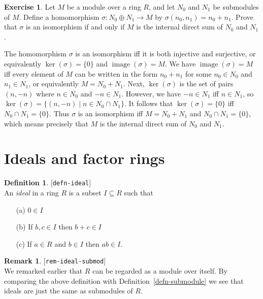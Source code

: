 \documentclass{amsart}
\newcommand{\lbl}[1]{\label{#1}\textup{[\texttt{#1}]}\ \\}
\newcommand{\lbl}{\label}
\newcommand{\img}       {\operatorname{image}}
\newcommand{\sg}        {\sigma}
\newcommand{\sse}       {\subseteq}
\newcommand{\xra}       {\xrightarrow}
\newcommand{\st}        {\;|\;}
\newcommand{\ip}[1]     {\langle #1\rangle}
\newcommand{\op}        {\oplus}
\renewcommand{\:}{\colon}
\theoremstyle{definition}
\newtheorem{remark}[theorem]{Remark}
\newtheorem{definition}[theorem]{Definition}
\newtheorem{exercise}{Exercise}[section]
\renewenvironment{solution}{\SolutionAtEnd}{\endSolutionAtEnd}
\begin{document}
\begin{exercise}
 Let $M$ be a module over a ring $R$, and let $N_0$ and $N_1$ be
 submodules of $M$.  Define a homomorphism $\sg\:N_0\op N_1\xra{}M$ by
 $\sg(n_0,n_1)=n_0+n_1$.  Prove that $\sg$ is an isomorphism if and
 only if $M$ is the internal direct sum of $N_0$ and $N_1$.
\end{exercise}
\begin{solution}
 The homomorphism $\sg$ is an isomorphism iff it is both injective and
 surjective, or equivalently $\ker(\sg)=\{0\}$ and $\img(\sg)=M$.  We
 have $\img(\sg)=M$ iff every element of $M$ can be written in the form
 $n_0+n_1$ for some $n_0\in N_0$ and $n_1\in N_1$, or equivalently
 $M=N_0+N_1$.  Next, $\ker(\sg)$ is the set of pairs $(n,-n)$ where
 $n\in N_0$ and $-n\in N_1$.  However, we have $-n\in N_1$ iff
 $n\in N_1$, so $\ker(\sg)=\{(n,-n)\st n\in N_0\cap N_1\}$.  It
 follows that $\ker(\sg)=\{0\}$ iff $N_0\cap N_1=\{0\}$.  Thus $\sg$
 is an isomorphism iff $M=N_0+N_1$ and $N_0\cap N_1=\{0\}$, which
 means precisely that $M$ is the internal direct sum of $N_0$ and
 $N_1$. 
\end{solution}


\section{Ideals and factor rings}
\label{sec-ideals}

\begin{definition}\lbl{defn-ideal}
 An \emph{ideal} in a ring $R$ is a subset $I\sse R$ such that
 \begin{itemize}
 \item[(a)] $0\in I$
 \item[(b)] If $b,c\in I$ then $b+c\in I$
 \item[(c)] If $a\in R$ and $b\in I$ then $ab\in I$.
 \end{itemize}
\end{definition}
\begin{remark}\lbl{rem-ideal-submod}
 We remarked earlier that $R$ can be regarded as a module over
 itself.  By comparing the above definition with
 Definition~\ref{defn-submodule} we see that ideals are just the same
 as submodules of $R$.
\end{remark}
\end{document}
